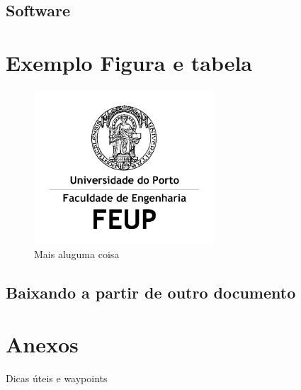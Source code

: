 \documentclass[12pt]{report}
\begin{document}
\section{Software}


\chapter{Exemplo Figura e tabela}

\begin{figure}[!htb]
\centering
\includegraphics[width=0.60\textwidth]{FEUP_Logo}
\caption[alguma coisa.]{Mais aluguma coisa} \label{fig:Array}
\end{figure}

\section{Baixando a partir de outro documento}

%
%
\appendix
\renewcommand{\chaptername}{Anexos}
\chapter{Anexos}
Dicas úteis e waypoints
\end{document}
